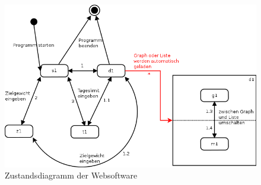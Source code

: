 \begin{figure}[h]
\centering
  \includegraphics[scale=0.55]{diagramme/kapitel5/zustand_dialog_beziehung_web.png}
  \caption{Zustandsdiagramm der Websoftware}
\end{figure}